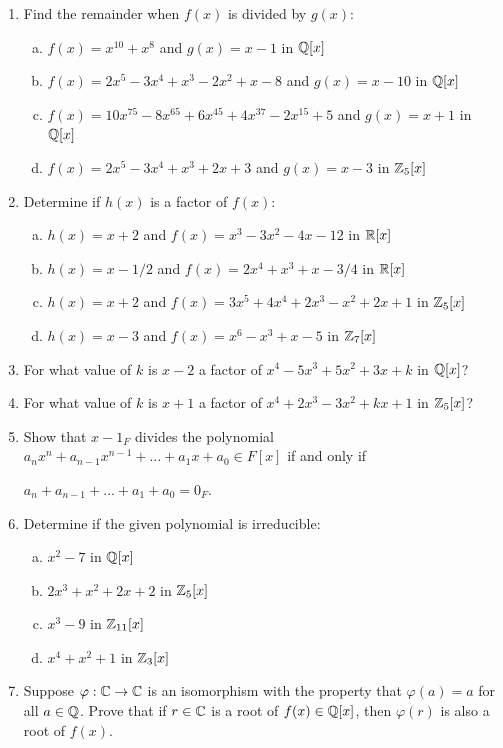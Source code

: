 \documentclass[11pt,fleqn,dvipsnames,usenames]{article}
\begin{document}
\begin{enumerate}[1.]
\item Find the remainder when $f(x)$ is divided by $g(x)$:
\begin{enumerate}[(a)]
\item $f(x) = x^{10} + x^8$ and $g(x) = x -1$ in $\mathbb{Q}[x]$
\item $f(x) = 2x^5 - 3x^4 + x^3 - 2x^2 + x - 8$ and $g(x) = x - 10$ in $\mathbb{Q}[x]$
\item $f(x) = 10x^{75} - 8x^{65} + 6x^{45} + 4x^{37} - 2x^{15} + 5$ and $g(x) = x + 1$ in $\mathbb{Q}[x]$
\item $f(x) = 2x^5 - 3x^4 + x^3 + 2x + 3$ and $g(x) = x - 3$ in $\mathbb{Z}_{5}[x]$
\end{enumerate}

\item Determine if $h(x)$ is a factor of $f(x)$:
\begin{enumerate}[(a)]
\item $h(x) = x + 2$ and $f(x) = x^3 - 3x^2 - 4x - 12$ in $\mathbb{R}[x]$
\item $h(x) = x - 1/2$ and $f(x) = 2x^4 + x^3 + x - 3/4$ in $\mathbb{R}[x]$
\item $h(x) = x + 2$ and $f(x) = 3x^5 + 4x^4 + 2x^3 - x^2 + 2x + 1$ in $\mathbb{Z}_{5}[x]$
\item $h(x) = x - 3$ and $f(x) = x^6 - x^3 + x - 5$ in $\mathbb{Z}_{7}[x]$
\end{enumerate}

\item For what value of $k$ is $x-2$ a factor of $x^4 - 5x^3 + 5x^2 + 3x + k$ in $\mathbb{Q}[x]$?

\item For what value of $k$ is $x+1$ a factor of $x^4 + 2x^3 - 3x^2 + kx + 1$ in $\mathbb{Z}_{5}[x]$?

\item Show that $x -1_{F}$ divides the polynomial $a_{n}x^{n} + a_{n-1}x^{n-1} + \ldots + a_{1}x + a_{0}\in F[x]$ if and only if
\begin{center}
$a_{n} + a_{n-1} + \ldots + a_{1} + a_{0} = 0_{F}$.
\end{center}

\item Determine if the given polynomial is irreducible:
\begin{enumerate}[(a)]
\item $x^2 - 7$ in $\mathbb{Q}[x]$
\item $2x^3 + x^2 + 2x + 2$ in $\mathbb{Z}_{5}[x]$
\item $x^3 - 9$ in $\mathbb{Z}_{11}[x]$
\item $x^4 + x^2 + 1$ in $\mathbb{Z}_{3}[x]$
\end{enumerate}

\item Suppose $\varphi:\mathbb{C}\to\mathbb{C}$ is an isomorphism with the property that $\varphi(a) = a$ for all $a\in \mathbb{Q}$.  Prove that if $r\in\mathbb{C}$ is a root of $f(x)\in \mathbb{Q}[x]$, then $\varphi(r)$ is also a root of $f(x)$.
\end{enumerate}
\newpage
\end{document}
